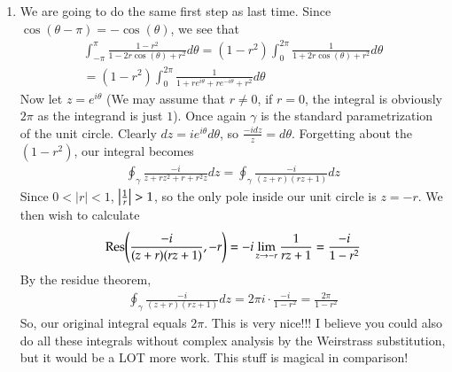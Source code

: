 \documentclass[12pt]{article}
\theoremstyle{definition}
\theoremstyle{remark}
\begin{document}
\begin{enumerate}[leftmargin=\labelsep]
		\item We are going to do the same first step as last time. Since $\cos(\theta-\pi) = -\cos(\theta)$, we see that
		\begin{align*}
			\int_{-\pi}^\pi \frac{1-r^2}{1-2r\cos(\theta)+r^2}d\theta = (1-r^2)\int_0^{2\pi} \frac{1}{1+2r\cos(\theta)+r^2}d\theta \\
			= (1-r^2)\int_0^{2\pi} \frac{1}{1+re^{i\theta}+re^{-i\theta}+r^2}d\theta
		\end{align*}
		Now let $z = e^{i\theta}$ (We may assume that $r \neq 0$, if $r = 0$, the integral is obviously $2\pi$ as the integrand is just  $1$). Once again $\gamma$ is the standard parametrization of the unit circle. Clearly $dz = ie^{i\theta}d\theta$, so $\frac{-idz}{z} = d\theta$. Forgetting about the $(1-r^2)$, our integral becomes 
		\begin{align*}
			\oint_\gamma \frac{-i}{z+rz^2+r+r^2z}dz = \oint_\gamma \frac{-i}{(z+r)(rz+1)}dz 
		\end{align*}
		Since $0 < |r| < 1$, $\qty|\frac1r| > 1$, so the only pole inside our unit circle is $z = -r$. We then wish to calculate
		\begin{align*}
			\Res(\frac{-i}{(z+r)(rz+1)}, -r) = -i \lim_{z \to -r} \frac{1}{rz+1} = \frac{-i}{1-r^2}
		\end{align*}
		By the residue theorem,
		\begin{align*}
			\oint_\gamma \frac{-i}{(z+r)(rz+1)}dz = 2\pi i \cdot \frac{-i}{1-r^2} = \frac{2\pi}{1-r^2}
		\end{align*}
		So, our original integral equals $2\pi$. This is very nice!!! I believe you could also do all these integrals without complex analysis by the Weirstrass substitution, but it would be a LOT more work. This stuff is magical in comparison!
	\end{enumerate}
\end{document}
